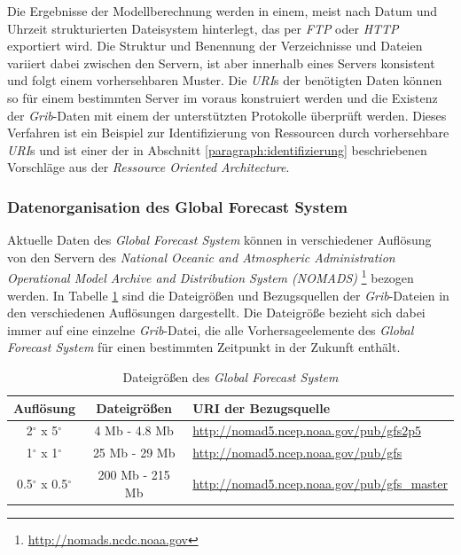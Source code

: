 Die Ergebnisse der Modellberechnung werden in einem, meist nach Datum
und Uhrzeit strukturierten Dateisystem hinterlegt, das per
\textit{FTP} oder \textit{HTTP} exportiert wird. Die Struktur und
Benennung der Verzeichnisse und Dateien variiert dabei zwischen den
Servern, ist aber innerhalb eines Servers konsistent und folgt einem
vorhersehbaren Muster. Die \textit{URI}s der benötigten Daten können
so für einem bestimmten Server im voraus konstruiert werden und die
Existenz der \textit{Grib}-Daten mit einem der unterstützten
Protokolle überprüft werden. Dieses Verfahren ist ein Beispiel zur
Identifizierung von Ressourcen durch vorhersehbare \textit{URI}s und
ist einer der in Abschnitt \ref{paragraph:identifizierung}
beschriebenen Vorschläge aus der \textit{Ressource Oriented
  Architecture}.

\subsubsection{Datenorganisation des Global Forecast System}
Aktuelle Daten des \textit{Global Forecast System} können in
verschiedener Auflösung von den Servern des \textit{National Oceanic
  and Atmospheric Administration Operational Model Archive and
  Distribution System (NOMADS)} 
\footnote{\url{http://nomads.ncdc.noaa.gov}} bezogen werden. In
Tabelle \ref{tab:gfs_auflösungen} sind die Dateigrößen und
Bezugsquellen der \textit{Grib}-Dateien in den verschiedenen
Auflösungen dargestellt. Die Dateigröße bezieht sich dabei immer auf
eine einzelne \textit{Grib}-Datei, die alle Vorhersageelemente des
\textit{Global Forecast System} für einen bestimmten Zeitpunkt in der
Zukunft enthält.

\begin{table}[h]
  \centering
  {\sf
    \footnotesize
    \begin{longtable}{@{}ccl}

      \toprule
      \textbf{Auflösung} & \textbf{Dateigrößen} & \textbf{URI der Bezugsquelle} \\

      \midrule

      2$^{\circ}$ x 5$^{\circ}$ & 4 Mb - 4.8 Mb & \url{http://nomad5.ncep.noaa.gov/pub/gfs2p5} \\
      1$^{\circ}$ x 1$^{\circ}$ & 25 Mb - 29 Mb & \url{http://nomad5.ncep.noaa.gov/pub/gfs} \\
      0.5$^{\circ}$ x 0.5$^{\circ}$ & 200 Mb - 215 Mb & \url{http://nomad5.ncep.noaa.gov/pub/gfs_master} \\

      \bottomrule

    \end{longtable}
  }

  \caption{Dateigrößen des \textit{Global Forecast System}}
  \label{tab:gfs_auflösungen}

\end{table}

